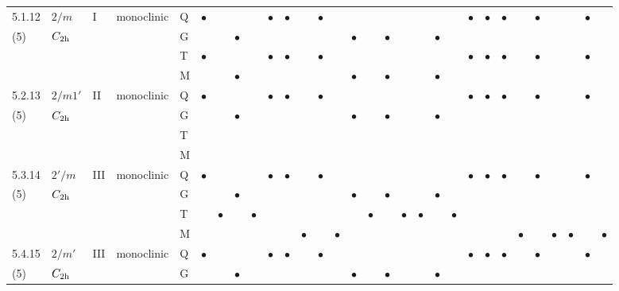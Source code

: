 \documentclass[fleqn,9pt,landscape]{jsarticle}
\begin{document}
\begin{longtable}{lllll|l|lll|ll|lll|l|lll|lll|l|ll|lll|lll}
5.1.12 & \texttt{$2/m$} & I & monoclinic & Q & $\bullet$ &  &  &  & $\bullet$ & $\bullet$ &  & $\bullet$ &  &  &  &  &  &  &  &  & $\bullet$ & $\bullet$ & $\bullet$ &  & $\bullet$ &  &  & $\bullet$ &  \\
(5) & $C_{\rm 2h}$ &  &  & G &  &  & $\bullet$ &  &  &  &  &  &  & $\bullet$ &  & $\bullet$ &  &  & $\bullet$ &  &  &  &  &  &  &  &  &  &  \\
 &  &  &  & T & $\bullet$ &  &  &  & $\bullet$ & $\bullet$ &  & $\bullet$ &  &  &  &  &  &  &  &  & $\bullet$ & $\bullet$ & $\bullet$ &  & $\bullet$ &  &  & $\bullet$ &  \\
 &  &  &  & M &  &  & $\bullet$ &  &  &  &  &  &  & $\bullet$ &  & $\bullet$ &  &  & $\bullet$ &  &  &  &  &  &  &  &  &  &  \\ \hline
5.2.13 & \texttt{$2/m1'$} & II & monoclinic & Q & $\bullet$ &  &  &  & $\bullet$ & $\bullet$ &  & $\bullet$ &  &  &  &  &  &  &  &  & $\bullet$ & $\bullet$ & $\bullet$ &  & $\bullet$ &  &  & $\bullet$ &  \\
(5) & $C_{\rm 2h}$ &  &  & G &  &  & $\bullet$ &  &  &  &  &  &  & $\bullet$ &  & $\bullet$ &  &  & $\bullet$ &  &  &  &  &  &  &  &  &  &  \\
 &  &  &  & T &  &  &  &  &  &  &  &  &  &  &  &  &  &  &  &  &  &  &  &  &  &  &  &  &  \\
 &  &  &  & M &  &  &  &  &  &  &  &  &  &  &  &  &  &  &  &  &  &  &  &  &  &  &  &  &  \\ \hline
5.3.14 & \texttt{$2'/m$} & III & monoclinic & Q & $\bullet$ &  &  &  & $\bullet$ & $\bullet$ &  & $\bullet$ &  &  &  &  &  &  &  &  & $\bullet$ & $\bullet$ & $\bullet$ &  & $\bullet$ &  &  & $\bullet$ &  \\
(5) & $C_{\rm 2h}$ &  &  & G &  &  & $\bullet$ &  &  &  &  &  &  & $\bullet$ &  & $\bullet$ &  &  & $\bullet$ &  &  &  &  &  &  &  &  &  &  \\
 &  &  &  & T &  & $\bullet$ &  & $\bullet$ &  &  &  &  &  &  & $\bullet$ &  & $\bullet$ & $\bullet$ &  & $\bullet$ &  &  &  &  &  &  &  &  &  \\
 &  &  &  & M &  &  &  &  &  &  & $\bullet$ &  & $\bullet$ &  &  &  &  &  &  &  &  &  &  & $\bullet$ &  & $\bullet$ & $\bullet$ &  & $\bullet$ \\ \hline
5.4.15 & \texttt{$2/m'$} & III & monoclinic & Q & $\bullet$ &  &  &  & $\bullet$ & $\bullet$ &  & $\bullet$ &  &  &  &  &  &  &  &  & $\bullet$ & $\bullet$ & $\bullet$ &  & $\bullet$ &  &  & $\bullet$ &  \\
(5) & $C_{\rm 2h}$ &  &  & G &  &  & $\bullet$ &  &  &  &  &  &  & $\bullet$ &  & $\bullet$ &  &  & $\bullet$ &  &  &  &  &  &  &  &  &  &  \\

\end{longtable}
\end{document}
